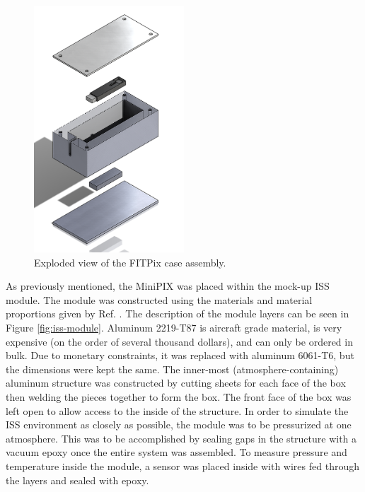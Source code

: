 \begin{figure}[h!]
	\begin{center}
		\includegraphics[width=0.5\textwidth]{figures/fitpix-case-exploded.png}
		\caption{Exploded view of the FITPix case assembly.}
		\label{fig:fitpix-container}
	\end{center}
\end{figure}

As previously mentioned, the MiniPIX was placed within the mock-up ISS module.
The module was constructed using the materials and material proportions given by Ref. \cite{NASA-ISS-Construction}.
The description of the module layers can be seen in Figure \ref{fig:iss-module}.
Aluminum 2219-T87 is aircraft grade material, is very expensive (on the order of several thousand dollars), and can only be ordered in bulk.
Due to monetary constraints, it was replaced with aluminum 6061-T6, but the dimensions were kept the same.
The inner-most (atmosphere-containing) aluminum structure was constructed by cutting sheets for each face of the box then welding the pieces together to form the box.
The front face of the box was left open to allow access to the inside of the structure.
In order to simulate the ISS environment as closely as possible, the module was to be pressurized at one atmosphere.
This was to be accomplished by sealing gaps in the structure with a vacuum epoxy once the entire system was assembled.
To measure pressure and temperature inside the module, a sensor was placed inside with wires fed through the layers and sealed with epoxy.

